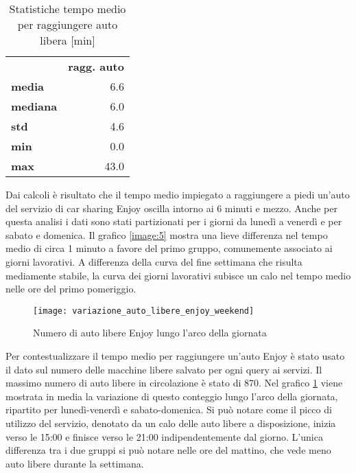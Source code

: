 \begin{table}[H]
	\centering
	\begin{tabular}{ | l r | }
		\hline
		& \textbf{ragg. auto} \\
		\textbf{media}   &  6.6 \\
		\textbf{mediana} &  6.0 \\
		\textbf{std}     &  4.6 \\
		\textbf{min}     &  0.0 \\ 
		\textbf{max}     & 43.0 \\
		\hline
	\end{tabular}
	\caption{Statistiche tempo medio per raggiungere auto libera [min]}
	\label{table:4}
\end{table}

Dai calcoli è risultato che il tempo medio impiegato a raggiungere a piedi un'auto del servizio di car sharing Enjoy oscilla intorno ai 6 minuti e mezzo. Anche per questa analisi i dati sono stati partizionati per i giorni da lunedì a venerdì e per sabato e domenica. Il grafico \ref{image:5} mostra una lieve differenza nel tempo medio di circa 1 minuto a favore del primo gruppo, comunemente associato ai giorni lavorativi. A differenza della curva del fine settimana che risulta mediamente stabile, la curva dei giorni lavorativi subisce un calo nel tempo medio nelle ore del primo pomeriggio.

\begin{figure}[H]
	\texttt{[image: variazione\_auto\_libere\_enjoy\_weekend]}
	\caption{Numero di auto libere Enjoy lungo l'arco della giornata}
	\label{image:6}
\end{figure}

Per contestualizzare il tempo medio per raggiungere un'auto Enjoy è stato usato il dato sul numero delle macchine libere salvato per ogni query ai servizi. Il massimo numero di auto libere in circolazione è stato di 870. Nel grafico \ref{image:6} viene mostrata in media la variazione di questo conteggio lungo l'arco della giornata, ripartito per lunedì-venerdì e sabato-domenica. Si può notare come il picco di utilizzo del servizio, denotato da un calo delle auto libere a disposizione, inizia verso le 15:00 e finisce verso le 21:00 indipendentemente dal giorno. L'unica differenza tra i due gruppi si può notare nelle ore del mattino, che vede meno auto libere durante la settimana.


